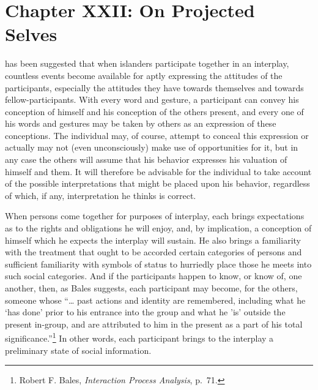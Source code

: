 \documentclass[twoside,symmetric,nobib,justified]{tufte-book}
\let\oldchapter\chapter
\def\chapter{%
  \setcounter{footnote}{0}%
  \oldchapter
}
\begin{document}
\chapter[CHAPTER XXII: ON PROJECTED SELVES]{Chapter XXII: On Projected Selves}
\label{ch:Chapter XXII: On Projected Selves}

 has been suggested that when islanders
participate together in an interplay, countless events become available
for aptly expressing the attitudes of the participants, especially the
attitudes they have towards themselves and towards fellow-participants.
With every word and gesture, a participant can convey his conception of
himself and his conception of the others present, and every one of his
words and gestures may be taken by others as an expression of these
conceptions. The individual may, of course, attempt to conceal this
expression or actually may not (even unconsciously) make use of
opportunities for it, but in any case the others will assume that his
behavior expresses his valuation of himself and them. It will therefore
be advisable for the individual to take account of the possible
interpretations that might be placed upon his behavior, regardless of
which, if any, interpretation he thinks is correct.

When persons come together for purposes of interplay, each brings
expectations as to the rights and obligations he will enjoy, and, by
implication, a conception of himself which he expects the interplay will
sustain. He also brings a familiarity with the treatment that ought to
be accorded certain categories of persons and sufficient familiarity
with symbols of status to hurriedly place those he meets into such
social categories. And if the participants happen to know, or know of,
one another, then, as Bales suggests, each participant may become, for
the others, someone whose ``\ldots{} past actions and identity are
remembered, including what he `has done' prior to his entrance into the
group and what he 'is' outside the present in-group, and are attributed
to him in the present as a part of his total significance.''\footnote{Robert
  F. Bales, \emph{Interaction Process Analysis}, p.~71.} In other words,
each participant brings to the interplay a preliminary state of social
information.
\end{document}

